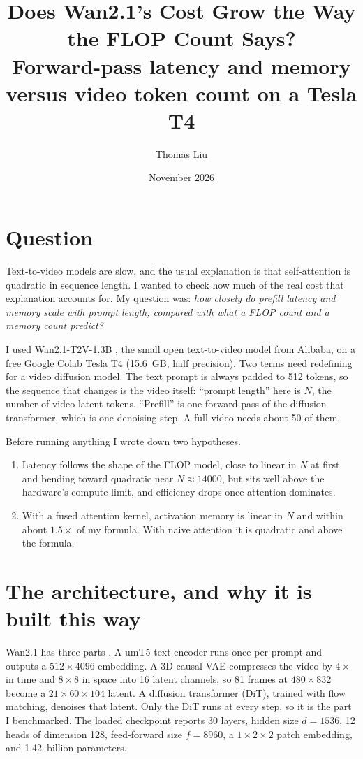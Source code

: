 \documentclass[11pt]{article}
\title{Does Wan2.1's Cost Grow the Way the FLOP Count Says?\\
\large Forward-pass latency and memory versus video token count on a Tesla T4}
\author{Thomas Liu}
\date{November 2026}
\begin{document}
\maketitle

\section{Question}

Text-to-video models are slow, and the usual explanation is that self-attention is quadratic in sequence length. I wanted to check how much of the real cost that explanation accounts for. My question was: \emph{how closely do prefill latency and memory scale with prompt length, compared with what a FLOP count and a memory count predict?}

I used Wan2.1-T2V-1.3B \cite{wan}, the small open text-to-video model from Alibaba, on a free Google Colab Tesla T4 (\SI{15.6}{GB}, half precision). Two terms need redefining for a video diffusion model. The text prompt is always padded to 512 tokens, so the sequence that changes is the video itself: ``prompt length'' here is $N$, the number of video latent tokens. ``Prefill'' is one forward pass of the diffusion transformer, which is one denoising step. A full video needs about 50 of them.

Before running anything I wrote down two hypotheses.
\begin{enumerate}
\item Latency follows the shape of the FLOP model, close to linear in $N$ at first and bending toward quadratic near $N \approx \num{14000}$, but sits well above the hardware's compute limit, and efficiency drops once attention dominates.
\item With a fused attention kernel, activation memory is linear in $N$ and within about $1.5\times$ of my formula. With naive attention it is quadratic and above the formula.
\end{enumerate}

\section{The architecture, and why it is built this way}

Wan2.1 has three parts \cite{wan}. A umT5 text encoder runs once per prompt and outputs a $512 \times 4096$ embedding. A 3D causal VAE compresses the video by $4\times$ in time and $8\times 8$ in space into 16 latent channels, so 81 frames at $480 \times 832$ become a $21 \times 60 \times 104$ latent. A diffusion transformer (DiT), trained with flow matching, denoises that latent. Only the DiT runs at every step, so it is the part I benchmarked. The loaded checkpoint reports 30 layers, hidden size $d = 1536$, 12 heads of dimension 128, feed-forward size $f = 8960$, a $1\times2\times2$ patch embedding, and \num{1.42}~billion parameters.
\end{document}
